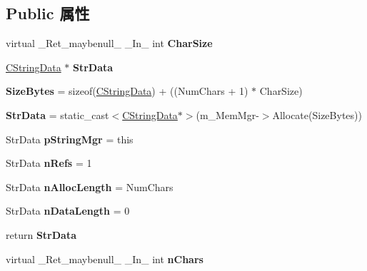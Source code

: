 \subsection*{Public 属性}
\begin{DoxyCompactItemize}
\item 
virtual \+\_\+\+Ret\+\_\+maybenull\+\_\+ \+\_\+\+In\+\_\+ int {\bfseries Char\+Size}
\item 
\mbox{\label{class_a_t_l_1_1_c_atl_string_mgr_afa042e6e73d582034cbdf8ba2e06fcfb}} 
\hyperlink{struct_a_t_l_1_1_c_string_data}{C\+String\+Data} $\ast$ {\bfseries Str\+Data}
\item 
\mbox{\label{class_a_t_l_1_1_c_atl_string_mgr_ab64795ccb8a46f896514b5fd4bdf5589}} 
{\bfseries Size\+Bytes} = sizeof(\hyperlink{struct_a_t_l_1_1_c_string_data}{C\+String\+Data}) + ((Num\+Chars + 1) $\ast$ Char\+Size)
\item 
\mbox{\label{class_a_t_l_1_1_c_atl_string_mgr_a873ae22a3b2aca51b1f1957b11beb3c6}} 
{\bfseries Str\+Data} = static\+\_\+cast$<$\hyperlink{struct_a_t_l_1_1_c_string_data}{C\+String\+Data}$\ast$$>$(m\+\_\+\+Mem\+Mgr-\/$>$Allocate(Size\+Bytes))
\item 
\mbox{\label{class_a_t_l_1_1_c_atl_string_mgr_aa13607dd8a8a40baa05da979f7c87cf3}} 
Str\+Data {\bfseries p\+String\+Mgr} = this
\item 
\mbox{\label{class_a_t_l_1_1_c_atl_string_mgr_a75600a4252d972c7d9b553bef9f75adb}} 
Str\+Data {\bfseries n\+Refs} = 1
\item 
\mbox{\label{class_a_t_l_1_1_c_atl_string_mgr_a4a3588cbb291fdec9332447b3bf8536e}} 
Str\+Data {\bfseries n\+Alloc\+Length} = Num\+Chars
\item 
\mbox{\label{class_a_t_l_1_1_c_atl_string_mgr_ab2465111d0307978a87078729dd3ccaf}} 
Str\+Data {\bfseries n\+Data\+Length} = 0
\item 
\mbox{\label{class_a_t_l_1_1_c_atl_string_mgr_aef254c84eff68437fadb0093c6d91d4f}} 
return {\bfseries Str\+Data}
\item 
\mbox{\label{class_a_t_l_1_1_c_atl_string_mgr_a2fc7e7b0c57031d94b5070bc95292b35}} 
virtual \+\_\+\+Ret\+\_\+maybenull\+\_\+ \+\_\+\+In\+\_\+ int {\bfseries n\+Chars}
\end{DoxyCompactItemize}
